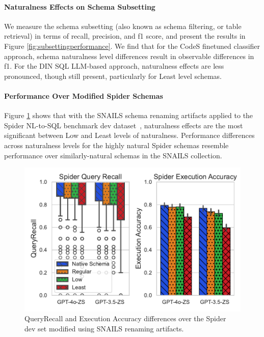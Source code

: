 \paragraph{\textbf{Naturalness Effects on Schema Subsetting}}
We measure the schema subsetting (also known as schema filtering, or table retrieval) in terms of recall, precision, and f1 score, and present the results in Figure \ref{fig:subsettingperformance}.
We find that for the CodeS finetuned classifier approach, schema naturalness level differences result in observable differences in f1.
For the DIN SQL LLM-based approach, naturalness effects are less pronounced, though still present, particularly for Least level schemas.

\paragraph{\textbf{Performance Over Modified Spider Schemas}}
Figure \ref{fig:spiderresults} shows that with the SNAILS schema renaming artifacts applied to the Spider NL-to-SQL benchmark dev dataset~\cite{Yu&al.18c}, naturalness effects are the most significant between Low and Least levels of naturalness.
Performance differences across naturalness levels for the highly natural Spider schemas resemble performance over similarly-natural schemas in the SNAILS collection.

\begin{figure}
  \centering
  \includegraphics[width=\figwidthmod\linewidth]{figures/spider-combined-results.pdf}
  \caption{QueryRecall and Execution Accuracy differences over the Spider~\cite{Yu&al.18c} dev set modified using SNAILS renaming artifacts.}
  \label{fig:spiderresults}
\end{figure}

